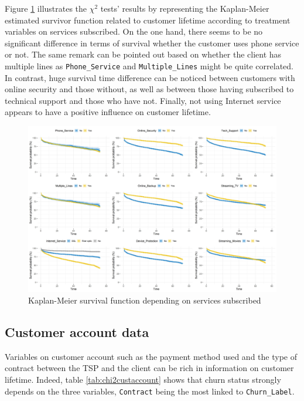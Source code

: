 \documentclass[
]{book}
\begin{document}
Figure \ref{fig:kmservices} illustrates the \(\chi^2\) tests' results by representing the Kaplan-Meier estimated survivor function related to customer lifetime according to treatment variables on services subscribed. On the one hand, there seems to be no significant difference in terms of survival whether the customer uses phone service or not. The same remark can be pointed out based on whether the client has multiple lines as \texttt{Phone\_Service} and \texttt{Multiple\_Lines} might be quite correlated. In contrast, huge survival time difference can be noticed between customers with online security and those without, as well as between those having subscribed to technical support and those who have not. Finally, not using Internet service appears to have a positive influence on customer lifetime.

\begin{figure}

{\centering \includegraphics[width=75in]{./imgs/services_plot} 

}

\caption{Kaplan-Meier survival function depending on services subscribed}\label{fig:kmservices}
\end{figure}

\hypertarget{customer-account-data}{%
\subsection*{Customer account data}\label{customer-account-data}}

Variables on customer account such as the payment method used and the type of contract between the TSP and the client can be rich in information on customer lifetime. Indeed, table \ref{tab:chi2custaccount} shows that churn status strongly depends on the three variables, \texttt{Contract} being the most linked to \texttt{Churn\_Label}.
\end{document}
